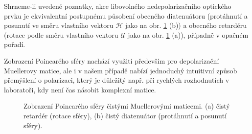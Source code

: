 Shrneme-li uvedené poznatky, akce libovolného nedepolarizačního optického prvku je ekvivalentní postupnému působení obecného diatenuátoru (protáhnutí a posunutí ve směru vlastního vektoru $\mathcal{H}$ jako na obr. \ref{fig:UH-Mueller} (b)) a obecného retardéru (rotace podle směru vlastního vektoru $\mathcal{U}$ jako na obr. \ref{fig:UH-Mueller} (a)), případně v opačném pořadí.

Zobrazení Poincarého sféry nachází využití především pro depolarizační Muellerovy matice, ale i v našem případě nabízí jednoduchý intuitivní způsob přemýšlení o polarizaci, který je důležitý např. při rychlých rozhodnutích v laboratoři, kdy není čas násobit komplexní matice.

\begin{figure}[htbp]
    \centering
    \begin{subfigure}{.3\textwidth}
        \centering
        
    \end{subfigure}
    \begin{subfigure}{.67\textwidth}
        \centering
        
    \end{subfigure}
    \caption{Zobrazení Poincarého sféry čistými Muellerovými maticemi. (a) čistý retardér (rotace sféry), (b) čistý diatenuátor (protáhnutí a posunutí sféry).}
    \label{fig:UH-Mueller}
\end{figure}
